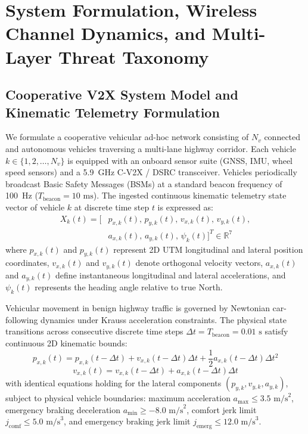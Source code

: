 \documentclass[journal]{IEEEtran}
\begin{document}
\section{System Formulation, Wireless Channel Dynamics, and Multi-Layer Threat Taxonomy}

\subsection{Cooperative V2X System Model and Kinematic Telemetry Formulation}
We formulate a cooperative vehicular ad-hoc network consisting of $N_v$ connected and autonomous vehicles traversing a multi-lane highway corridor. Each vehicle $k \in \{1, 2, \dots, N_v\}$ is equipped with an onboard sensor suite (GNSS, IMU, wheel speed sensors) and a 5.9~GHz C-V2X / DSRC transceiver. Vehicles periodically broadcast Basic Safety Messages (BSMs) at a standard beacon frequency of 100~Hz ($T_{\text{beacon}} = 10\text{ ms}$). The ingested continuous kinematic telemetry state vector of vehicle $k$ at discrete time step $t$ is expressed as:
\begin{equation}
\begin{split}
    X_k(t) = \big[ &p_{x,k}(t),\, p_{y,k}(t),\, v_{x,k}(t),\, v_{y,k}(t), \\
    &a_{x,k}(t),\, a_{y,k}(t),\, \psi_k(t) \big]^T \in \mathbb{R}^7
\end{split}
\end{equation}
where $p_{x,k}(t)$ and $p_{y,k}(t)$ represent 2D UTM longitudinal and lateral position coordinates, $v_{x,k}(t)$ and $v_{y,k}(t)$ denote orthogonal velocity vectors, $a_{x,k}(t)$ and $a_{y,k}(t)$ define instantaneous longitudinal and lateral accelerations, and $\psi_k(t)$ represents the heading angle relative to true North.

Vehicular movement in benign highway traffic is governed by Newtonian car-following dynamics under Krauss acceleration constraints. The physical state transitions across consecutive discrete time steps $\Delta t = T_{\text{beacon}} = 0.01\text{ s}$ satisfy continuous 2D kinematic bounds:
\begin{equation}
    p_{x,k}(t) = p_{x,k}(t - \Delta t) + v_{x,k}(t - \Delta t)\Delta t + \frac{1}{2}a_{x,k}(t - \Delta t)\Delta t^2
\end{equation}
\begin{equation}
    v_{x,k}(t) = v_{x,k}(t - \Delta t) + a_{x,k}(t - \Delta t)\Delta t
\end{equation}
with identical equations holding for the lateral components $(p_{y,k}, v_{y,k}, a_{y,k})$, subject to physical vehicle boundaries: maximum acceleration $a_{\max} \le 3.5\text{ m/s}^2$, emergency braking deceleration $a_{\min} \ge -8.0\text{ m/s}^2$, comfort jerk limit $j_{\text{comf}} \le 5.0\text{ m/s}^3$, and emergency braking jerk limit $j_{\text{emerg}} \le 12.0\text{ m/s}^3$.
\end{document}
